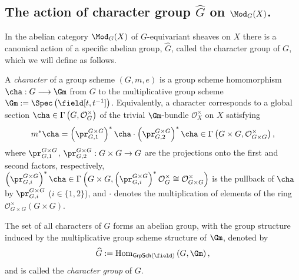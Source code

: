 \subsection{The action of character group $\widehat{G}$ on $\Mod_G(X)$.} In the abelian category $\Mod_G (X)$ of $G$-equivariant sheaves on $X$ there is a canonical action of a specific abelian group, $\widehat{G}$, called the character group of $G$, which we will define as follows.
\begin{defn}
A \emph{character} of a group scheme $(G,m,e)$ is a group scheme homomorphism
$
\cha : G \longrightarrow \Gm
$
from $G$ to the multiplicative group scheme
$\Gm := \Spec\left(\field[t, t^{-1}]\right)$.
Equivalently,
a character corresponds to a global section
$
\cha
\in
\Gamma\left(G, \mathcal{O}_G^\times\right)
$
of the trivial $\Gm$-bundle $\mathcal{O}_X^\times$ on $X$
satisfying
$$
m^* \cha
=
\left(\pr_{G,1}^{G \times G}\right)^* \cha
\cdot
\left(\pr_{G,2}^{G \times G}\right)^* \cha
\in
\Gamma\left(G \times G, \mathcal{O}_{G \times G}^\times\right),
$$
where
$\pr_{G,1}^{G \times G}$,
$\pr_{G,2}^{G \times G}
:
G \times G \rightarrow G
$
are the projections onto the first and second factors, respectively,
$
\left(\pr_{G,i}^{G \times G}\right)^* \cha
\in
\Gamma\left(
G \times G,
\left(\pr_{G,i}^{G \times G}\right)^*\mathcal{O}_G^\times
\cong
\mathcal{O}_{G \times G}^\times
\right)
$
is the pullback of $\cha$
by $\pr_{G,i}^{G\times G}$
($i\in\{1,2\}$),
and $\cdot$ denotes the multiplication of elements of the ring
$\mathcal{O}_{G\times G}^\times(G\times G)$.






The set of all characters of $G$ forms an abelian group,
with the group structure induced by the multiplicative group scheme structure of $\Gm$,
denoted by
$$
\widehat{G}
:=
\operatorname{Hom}_{\mathsf{GrpSch}(\field)}\left(G, \Gm\right),
$$
and is called the \emph{character group} of $G$.

\end{defn}




